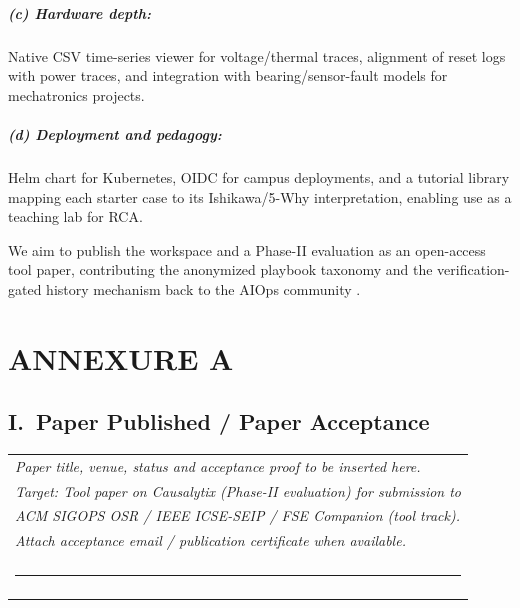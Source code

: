 \documentclass[12pt,a4paper,oneside]{report}
\newcommand{\blankline}[1][3cm]{\rule{#1}{0.4pt}}
\begin{document}
\paragraph{(c) Hardware depth:} Native CSV time-series viewer for voltage/thermal traces, alignment of reset logs with power traces, and integration with bearing/sensor-fault models \cite{zhang2022intelligent,susto2015machine,jardim2019predictive} for mechatronics projects.

\paragraph{(d) Deployment and pedagogy:} Helm chart for Kubernetes, OIDC for campus deployments, and a tutorial library mapping each starter case to its Ishikawa/5-Why interpretation, enabling use as a teaching lab for RCA.

We aim to publish the workspace and a Phase-II evaluation as an open-access tool paper, contributing the anonymized playbook taxonomy and the verification-gated history mechanism back to the AIOps community \cite{remil2024aiops,chen2024rcacopilot}.

\cleardoublepage
{}



\chapter*{ANNEXURE A}

\section*{I.\ Paper Published / Paper Acceptance}

\begin{center}
\begin{tabular}{|p{14cm}|}
\hline
\textit{Paper title, venue, status and acceptance proof to be inserted here.}\\
\textit{Target: Tool paper on Causalytix (Phase-II evaluation) for submission to} \\
\textit{ACM SIGOPS OSR / IEEE ICSE-SEIP / FSE Companion (tool track).}\\
\textit{Attach acceptance email / publication certificate when available.}\\
\\
\blankline[14cm] \\
\\
\hline
\end{tabular}
\end{center}
\end{document}
